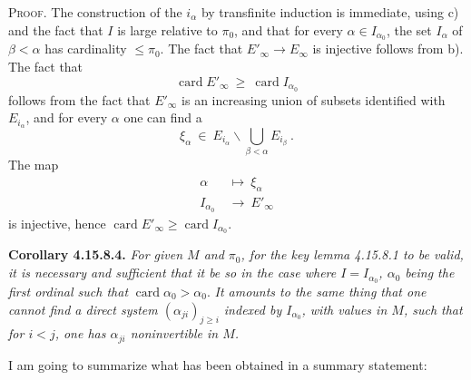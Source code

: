 \documentclass[11pt]{article}
\newcommand{\printedpage}[1]{\marginpar{\footnotesize p.~#1}}
\newcommand{\msp}[1]{\marginpar{\footnotesize [#1]}}
\newcommand{\card}{\operatorname{card}}
\begin{document}
\textsc{Proof}. The construction of the $i_\alpha$ by transfinite induction is immediate, using c) and the fact that $I$ is large relative to $\pi_0$, and that for every $\alpha \in I_{\alpha_0}$, the set $I_\alpha$
\printedpage{178}
of $\beta < \alpha$ has cardinality $\leqslant \pi_0$. The fact that $E'_\infty \longrightarrow E_\infty$ is injective follows from b). The fact that
\[
\card E'_\infty \ \geqslant \ \card I_{\alpha_0}
\]
follows from the fact that $E'_\infty$ is an increasing union of subsets identified with $E_{i_\alpha}$, and for every
\msp{page 460}
$\alpha$ one can find a
\[
\xi_\alpha \ \in \ E_{i_\alpha}\backslash \bigcup_{\beta<\alpha} E_{i_\beta} \ .
\]
The map
\[
\begin{aligned}
\alpha \ &\longmapsto \ \xi_\alpha\\
I_{\alpha_0} \ &\longrightarrow \ E'_\infty
\end{aligned}
\]
is injective, hence $\card E'_\infty \geqslant \card I_{\alpha_0}$.

\textbf{Corollary 4.15.8.4.} \textit{For given $M$ and $\pi_0$, for the key lemma 4.15.8.1 to be valid, it is necessary and sufficient that it be so in the case where $I = I_{\alpha_0}$, $\alpha_0$ being the first ordinal such that} $\card \alpha_0 > \alpha_0$. \textit{It amounts to the same thing that one cannot find a direct system $(\alpha_{ji})_{j\geqslant i}$ indexed by $I_{\alpha_0}$, with values in $M$, such that for $i < j$, one has $\alpha_{ji}$ noninvertible in $M$.} %

\msp{page 461}
I am going to summarize what has been obtained in a summary statement:
\end{document}
